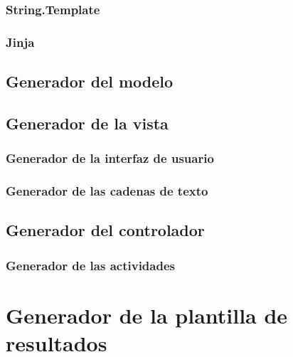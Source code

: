 \subsubsection{String.Template}
\subsubsection{Jinja}

\subsection{Generador del modelo}\label{sec:generacion}
\subsection{Generador de la vista}
\subsubsection{Generador de la interfaz de usuario}
\subsubsection{Generador de las cadenas de texto}

\subsection{Generador del controlador}
\subsubsection{Generador de las actividades}

\section{Generador de la plantilla de resultados}

